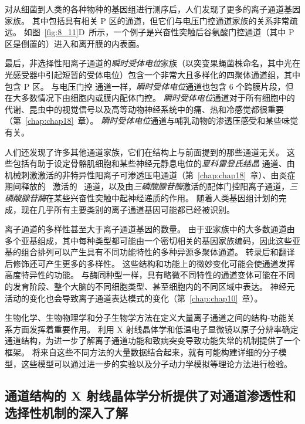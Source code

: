 对从细菌到人类的各种物种的基因组进行测序后，人们发现了更多的离子通道基因家族。
其中包括具有相关 P 区的通道，但它们与电压门控通道家族的关系非常疏远。
如图~\ref{fig:8_11}D~所示，一个例子是兴奋性突触后谷氨酸门控通道（其中 P 区是倒置的）进入和离开膜的内表面。


最后，非选择性阳离子通道的\textit{瞬时受体电位}家族（以突变果蝇菌株命名，其中光在光感受器中引起短暂的受体电位）包含一个非常大且多样化的四聚体通道组，其中包含 P 区。
与电压门控  通道一样，\textit{瞬时受体电位}通道也包含 6 个跨膜片段，但在大多数情况下由细胞内或膜内配体门控。
\textit{瞬时受体电位}通道对于所有细胞中的代谢、昆虫中的视觉信号以及高等动物神经系统中的痛、热和冷感觉都很重要（第~\ref{chap:chap18}~章）。
\textit{瞬时受体电位}通道与哺乳动物的渗透压感受和某些味觉有关。


人们还发现了许多其他通道家族，它们在结构上与前面提到的那些通道无关。
这些包括有助于设定骨骼肌细胞和某些神经元静息电位的\textit{夏科雷登氏结晶}  通道、由机械刺激激活的非特异性阳离子可渗透压电通道（第~\ref{chap:chap18}~章）、由炎症期间释放的~ 激活的~ 通道，以及由\textit{三磷酸腺苷酶}激活的配体门控阳离子通道，\textit{三磷酸腺苷酶}在某些兴奋性突触中起神经递质的作用。
随着人类基因组计划的完成，现在几乎所有主要类别的离子通道基因可能都已经被识别。


离子通道的多样性甚至大于离子通道基因的数量。
由于亚家族中的大多数通道由多个亚基组成，其中每种类型都可能由一个密切相关的基因家族编码，因此这些亚基的组合排列可以产生具有不同功能特性的多种异源多聚体通道。
转录后和翻译后修饰还可产生更多的多样性。
这些结构和功能上的微妙变化可能会使通道发挥高度特异性的功能。
与酶同种型一样，具有略微不同特性的通道变体可能在不同的发育阶段、整个大脑的不同细胞类型、甚至细胞内的不同区域中表达。
神经元活动的变化也会导致离子通道表达模式的变化（第~\ref{chap:chap10}~章）。


生物化学、生物物理学和分子生物学方法在定义大量离子通道之间的结构-功能关系方面发挥着重要作用。
利用 X 射线晶体学和低温电子显微镜以原子分辨率确定通道结构，为进一步了解离子通道功能和致病突变导致功能失常的机制提供了一个框架。
将来自这些不同方法的大量数据结合起来，就有可能构建详细的分子模型，这些模型可以通过进一步的实验以及分子动力学模拟等理论方法进行检验。





\subsection{通道结构的 X 射线晶体学分析提供了对通道渗透性和选择性机制的深入了解}

